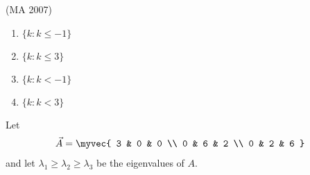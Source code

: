 \hfill{(MA 2007)}
\begin{multicols}{2}
\begin{enumerate}    
        \item $\{k : k \leq -1\}$
        \item $\{k : k \leq 3\}$
        \item $\{k : k < -1\}$
        \item  $\{k : k < 3\}$
    \end{enumerate}
\end{multicols}
\item Let
\begin{align*}
\vec{A} = \myvec{
3 & 0 & 0 \\
0 & 6 & 2 \\
0 & 2 & 6
}
\end{align*}
and let $\lambda_1 \geq \lambda_2 \geq \lambda_3$ be the eigenvalues of $A$.
